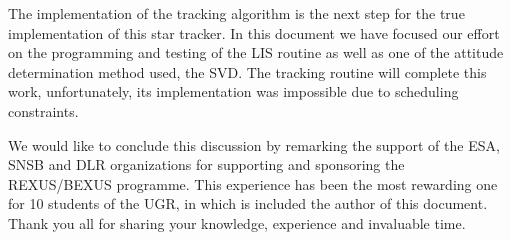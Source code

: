 The implementation of the tracking algorithm is the next step for the true implementation of this star tracker. In this document we have focused our effort on the programming and testing of the \gls{LIS} routine as well as one of the attitude determination method used, the SVD. The tracking routine will complete this work, unfortunately, its implementation was impossible due to scheduling constraints.

We would like to conclude this discussion by remarking the support of the \gls{ESA}, \gls{SNSB} and \gls{DLR} organizations for supporting and sponsoring the REXUS/BEXUS programme. This experience has been the most rewarding one for 10 students of the \gls{UGR}, in which is included the author of this document. Thank you all for sharing your knowledge, experience and invaluable time. 




























